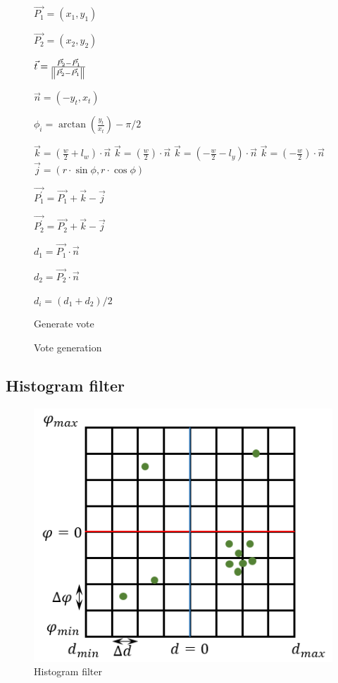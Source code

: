 \documentclass{article}
\begin{document}
\begin{figure} [ht]
\begin{algorithm}[H]
	$\vec{P_1} = (x_1, y_1)$

	$\vec{P_2} = (x_2, y_2)$

	$\vec{t} = \frac{\vec{P_2} - \vec{P_1}}
					{\norm{\vec{P_2} - \vec{P_1}}}$

	$\vec{n} = (-y_t, x_t)$

	$\phi_{i} = \arctan(\frac{y_t}{x_t}) - \pi / 2$

		{
			{
				$\vec{k} = (\frac{w}{2} + l_w) \cdot \vec{n}$
			}
			{
				$\vec{k} = (\frac{w}{2}) \cdot \vec{n}$
			}
		}
		{
			{
				$\vec{k} = (-\frac{w}{2} - l_y) \cdot \vec{n}$
			}
			{
				$\vec{k} = (-\frac{w}{2}) \cdot \vec{n}$
			}
		}
	$\vec{j} = (r \cdot \sin\phi, r \cdot \cos\phi)$

	$\vec{P_1^\prime} = \vec{P_1} + \vec{k} - \vec{j}$

	$\vec{P_2^\prime} = \vec{P_2} + \vec{k} - \vec{j}$

	$d_1 = \vec{P_1} \cdot \vec{n}$

	$d_2 = \vec{P_2} \cdot \vec{n}$

	$d_{i} = (d_1 + d_2) / 2$
	\caption{Generate vote}
\end{algorithm}
\caption{Vote generation}
\end{figure}
\FloatBarrier

\subsection{Histogram filter}

\begin{figure}[ht]
  \label{fig:histogram_filter}
  \centering
  \includegraphics[scale=0.9]{graphs/histogram_filter.PNG}
  \caption{Histogram filter}
\end{figure}
\FloatBarrier
\end{document}
